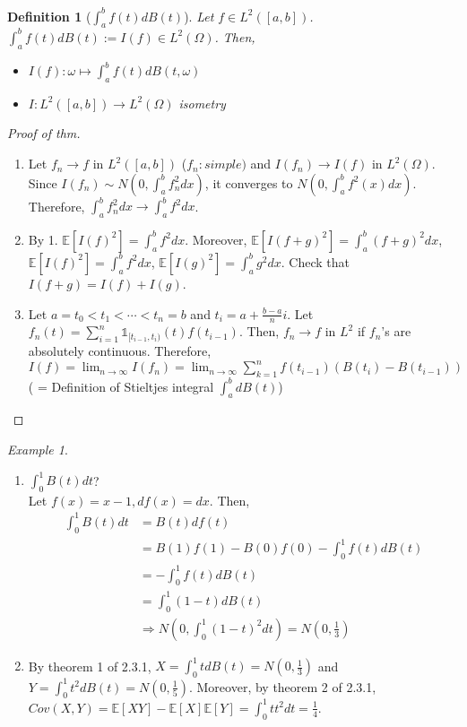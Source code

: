 \documentclass[12pt]{report}
\newcommand{\E}{\mathbb{E}}
\renewcommand{\1}{\mathbb{1}}
\renewcommand{\O}{\Omega}
\theoremstyle{break}
\theoremstyle{newdef}
\newtheorem{defn}[thm]{Definition} %
\theoremstyle{remark}
\newtheorem*{exmp}{Example} %
\begin{document}
\begin{defn}[$\int_a^b f(t)dB(t)$]
Let $f \in L^2([a,b])$. $\int_a^b f(t)dB(t) := I(f)\in L^2(\O)$. Then,
\begin{itemize}
\item $I(f) : \omega \mapsto \int_a^b f(t)dB(t,\omega)$
\item $I: L^2([a,b]) \rightarrow L^2(\O)$ isometry
\end{itemize}
\end{defn}

\begin{proof}[Proof of thm]
\leavevmode
\begin{enumerate}
\item
Let $f_n \rightarrow f$ in $L^2([a,b])$ ($f_n: simple)$ and $I(f_n) \rightarrow I(f)$ in $L^2(\O)$.
Since $I(f_n) \sim N(0, \int_a^b f_n^2 dx)$, it converges to $N(0,\int_a^b f^2(x)dx)$.
Therefore, $\int_a^b f_n^2dx \rightarrow \int_a^b f^2dx$.

\item By 1. $\E[I(f)^2] = \int_a^b f^2dx$. Moreover,
$\E[I(f+g)^2] = \int_a^b (f+g)^2 dx$,
$\E[I(f)^2] = \int_a^b f^2 dx$,
$\E[I(g)^2] = \int_a^b g^2 dx$.
Check that $I(f+g) = I(f)+I(g)$.

\item Let $a = t_0 < t_1 < \cdots < t_n = b$ and $t_i = a + \frac{b-a}{n}i$.
Let $f_n(t) = \sum_{i=1}^n \1_{[t_{i-1}, t_i)}(t) f(t_{i-1})$.
Then, $f_n \rightarrow f$ in $L^2$ if $f_n$'s are absolutely continuous.
Therefore, $I(f) = \lim_{n\rightarrow\infty} I(f_n) = \lim_{n\rightarrow\infty} \sum_{k=1}^n f(t_{i-1})(B(t_i)-B(t_{i-1}))$ ( = Definition of Stieltjes integral $\int_a^b dB(t)$)
\end{enumerate}
\end{proof}


\begin{exmp}
\leavevmode
\begin{enumerate}
\item $\int_0^1 B(t)dt$?\\
Let $f(x) = x-1, df(x) = dx$. Then,
$$
\begin{aligned}
\int_0^1 B(t)dt &= B(t)df(t)\\
&= B(1)f(1) - B(0)f(0) - \int_0^1 f(t)dB(t)\\
&= -\int_0^1 f(t)dB(t)\\
&= \int_0^1 (1-t)dB(t)\\
&\Rightarrow N(0, \int_0^1 (1-t)^2 dt)
= N(0,\frac{1}{3})
\end{aligned}
$$

\item
By theorem 1 of 2.3.1,
$X = \int_0^1 tdB(t) = N(0,\frac{1}{3})$ and
$Y = \int_0^1 t^2dB(t) = N(0,\frac{1}{5})$.
Moreover, by theorem 2 of 2.3.1, $Cov(X,Y) = \E[XY] - \E[X]\E[Y]
= \int_0^1 tt^2 dt = \frac{1}{4}$.

\end{enumerate}
\end{exmp}
\end{document}
